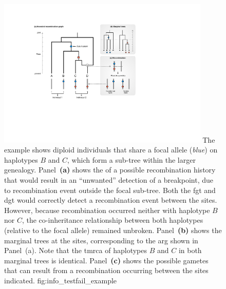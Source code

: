 

\begin{figure}[!htb]
\centering
\includegraphics[width=0.9\textwidth]{./img/ch3/info_testfail_example}
{The example shows  diploid individuals that share a focal allele (\emph{blue}) on haplotypes $B$ and $C$, which form a sub-tree within the larger genealogy.
Panel~\textbf{(a)} shows the  of a possible recombination history that would result in an ``unwanted'' detection of a breakpoint, due to recombination event outside the focal sub-tree.
Both the \gls{fgt} and \gls{dgt} would correctly detect a recombination event between the  sites.
However, because recombination occurred neither with haplotype $B$ nor $C$, the co-inheritance relationship between both haplotypes (relative to the focal allele) remained unbroken.
Panel~\textbf{(b)} shows the marginal trees at the  sites, corresponding to the \gls{arg} shown in Panel~(a).
Note that the \gls{tmrca} of haplotypes $B$ and $C$ in both marginal trees is identical.
Panel~\textbf{(c)} shows the possible gametes that can result from a recombination occurring between the  sites indicated.}
{fig:info_testfail_example}
\end{figure}
